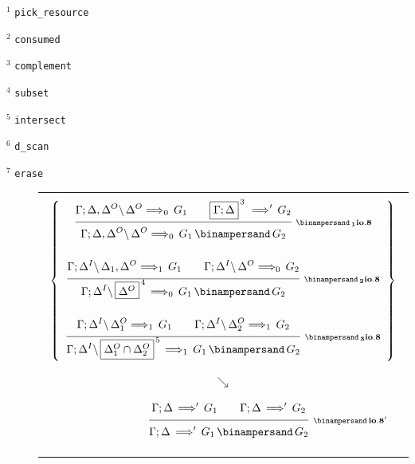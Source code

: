 \bigskip

$^1$ {\tt pick\_resource}

$^2$ {\tt consumed}

$^3$ {\tt complement}

$^4$ {\tt subset}

$^5$ {\tt intersect}

$^6$ {\tt d\_scan}

$^7$ {\tt erase}



\clearpage
\begin{figure}[t]
  \begin{center}
    \leavevmode

    \begin{tabular}{|c|c|}
      \hline
      \multicolumn{2}{|c|}{} \\
      \multicolumn{2}{|c|}{
        $\begin{array}{c}
          \left\{
            \begin{array}{c}
              \ruleII
                {\ioVIII{\G;\D,\D^O}{\D^O}{G_1}{0}}
                {\ioVIIIa{\fb{\G;\D}{3}}{G_2}}
                {\ioVIII{\G;\D,\D^O}{\D^O}{G_1 \With G_2}{0}}
                {\With_1 io.8}
            \\ \\
              \ruleII
                {\ioVIII{\G;\D^I}{\D_1,\D^O}{G_1}{1}}
                {\ioVIII{\G;\D^I}{\D^O}{G_2}{0}}
                {\ioVIII{\G;\D^I}{\fb{\D^O}{4}}{G_1 \With G_2}{0}}
                {\With_2 io.8}
            \\ \\
              \ruleII
                {\ioVIII{\G;\D^I}{\D^O_1}{G_1}{1}}
                {\ioVIII{\G;\D^I}{\D^O_2}{G_2}{1}}
                {\ioVIII
                  {\G;\D^I}
                  {\fb{\D^O_1 \cap \D^O_2}{5}}
                  {G_1 \With G_2}{1}}
                {\With_3 io.8}
            \end{array}
          \right\}
        \\ \\
        \searrow
        \\ \\
        \hspace{8em}
        \ruleII
          {\ioVIIIa{\G;\D}{G_1}}
          {\ioVIIIa{\G;\D}{G_2}}
          {\ioVIIIa{\G;\D}{G_1 \With G_2}}
          {\With io.8'}
        \end{array}$} \\
      \multicolumn{2}{|c|}{} \\
      \multicolumn{2}{|c|}{} \\


\end{tabular}
\end{center}
\end{figure}
